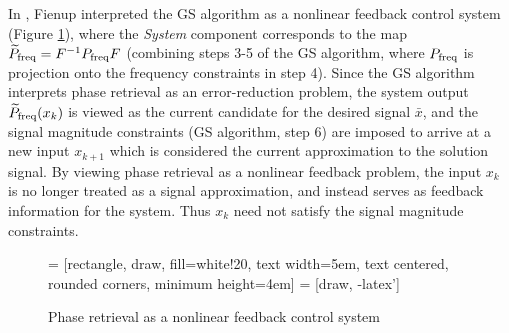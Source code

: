 In \cite{Fienup82},  Fienup interpreted the GS algorithm as a nonlinear feedback control system (Figure \ref{Fig:nonlinear_feedback_control_system}), where the \textit{System} component corresponds to the map $\widetilde{P}_\textnormal{freq} = F^{-1} P_\textnormal{freq} F$ (combining steps 3-5 of the GS algorithm, where $P_\textnormal{freq}$ is projection onto the frequency constraints in step 4).  Since the GS algorithm interprets phase retrieval as an error-reduction problem, the system output $\widetilde{P}_\textnormal{freq}(x_k)$ is viewed as the current candidate for the desired signal $\bar{x}$, and the signal magnitude constraints (GS algorithm, step 6) are imposed to arrive at a new input $x_{k+1}$ which is considered the current approximation to the solution signal.  By viewing phase retrieval as a nonlinear feedback problem, the input $x_k$ is no longer treated as a signal approximation, and instead serves as feedback information for the system.  Thus $x_k$ need not satisfy the signal magnitude constraints.


\begin{figure}[H]
\centering

 = [rectangle, draw, fill=white!20,
    text width=5em, text centered, rounded corners, minimum height=4em]
 = [draw, -latex']


\caption{Phase retrieval as a nonlinear feedback control system} \label{Fig:nonlinear_feedback_control_system}
\end{figure}


